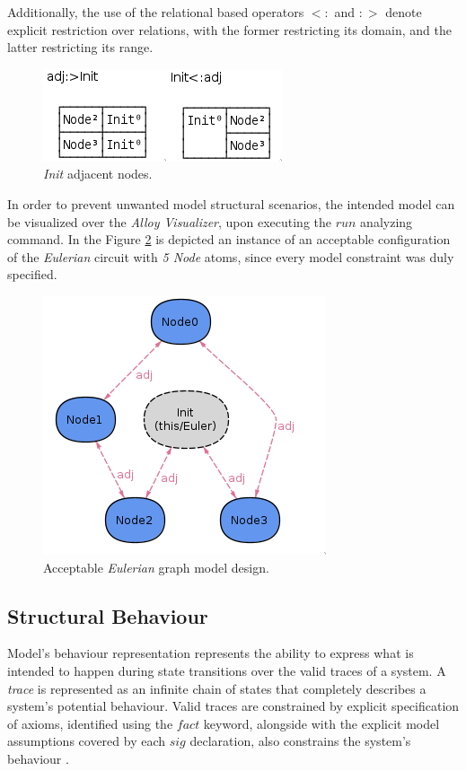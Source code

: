 Additionally, the use of the relational based operators $<:$ and $:>$ denote explicit restriction over relations, with the former restricting its domain, and the latter restricting its range.

\begin{figure}[H]
    \centering
    \includegraphics[width=0.4\linewidth]{images/alloy_evaluator2.png}
    \caption{\textit{Init} adjacent nodes.}
    \label{fig:alloy-evaluator_2}
\end{figure}


In order to prevent unwanted model structural scenarios, the intended model can be visualized over the \textit{Alloy Visualizer}, upon executing the $run$ analyzing command. In the Figure \ref{fig:alloy-eulerian_1} is depicted an instance of an acceptable configuration of the \textit{Eulerian} circuit with \textit{5 Node} atoms, since every model constraint was duly specified.

\begin{figure}[H]
    \centering
    \includegraphics[width=0.5\linewidth]{images/alloy_eulerian_1.png}
    \caption{Acceptable \textit{Eulerian} graph model design.}
    \label{fig:alloy-eulerian_1}
\end{figure}



\subsection{Structural Behaviour}

Model's behaviour representation represents the ability to express what is intended to happen during state transitions over the valid traces of a system. A \textit{trace} is represented as an infinite chain of states that completely describes a system's potential behaviour. Valid traces are constrained by explicit specification of axioms, identified using the $fact$ keyword, alongside with the explicit model assumptions covered by each $sig$ declaration, also constrains the system's behaviour \cite{gheyi2007formally}.

